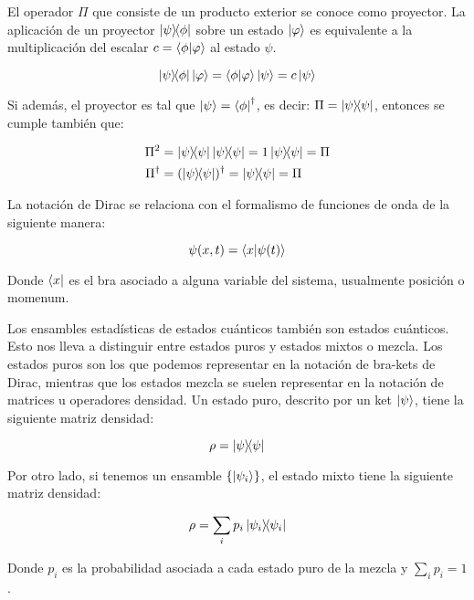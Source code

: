 El operador $\Pi$ que consiste de un producto exterior se conoce como proyector. La aplicación de un proyector $\ketbra{\psi}{\phi}$ sobre un estado $\ket{\varphi}$ es equivalente a la multiplicación del escalar $c = \braket{\phi}{\varphi}$ al estado $\psi$.

\begin{equation}
    \ketbra{\psi}{\phi} \ket{\varphi} = \braket{\phi}{\varphi} \ket{\psi} = c \ket{\psi}
\end{equation}

Si además, el proyector es tal que $\ket{\psi} = \bra{\phi}^\dagger$, es decir: $\Pi = \ketbra{\psi}{\psi}$, entonces se cumple también que:

\begin{align}
    \Pi^2 &= \ketbra{\psi}{\psi} \ketbra{\psi}{\psi} = 1 \ketbra{\psi}{\psi} = \Pi \\
    \Pi^\dagger &= (\ketbra{\psi}{\psi})^\dagger = \ketbra{\psi}{\psi} = \Pi
\end{align}

La notación de Dirac se relaciona con el formalismo de funciones de onda de la siguiente manera:

\begin{equation}
    \psi(x, t) = \braket{x}{\psi(t)}
\end{equation}

Donde $\bra{x}$ es el bra asociado a alguna variable del sistema, usualmente posición o momenum.

Los ensambles estadísticas de estados cuánticos también son estados cuánticos. Esto nos lleva a distinguir entre estados puros y estados mixtos o mezcla. Los estados puros son los que podemos representar en la notación de bra-kets de Dirac, mientras que los estados mezcla se suelen representar en la notación de matrices u operadores densidad. Un estado puro, descrito por un ket $\ket{\psi}$, tiene la siguiente matriz densidad:

\begin{equation}
    \rho = \ketbra{\psi}{\psi}
\end{equation}

Por otro lado, si tenemos un ensamble $\{\ket{\psi_i}\}$, el estado mixto tiene la siguiente matriz densidad:

\begin{equation}
    \rho = \sum_i p_i \ketbra{\psi_i}{\psi_i}
\end{equation}

Donde $p_i$ es la probabilidad asociada a cada estado puro de la mezcla y $\sum_i p_i = 1$.

